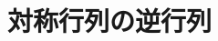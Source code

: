 \documentclass[../../../topic_linear-algebra]{subfiles}
\begin{document}
\sectionline
\section{対称行列の逆行列}

\todo{}
\end{document}
